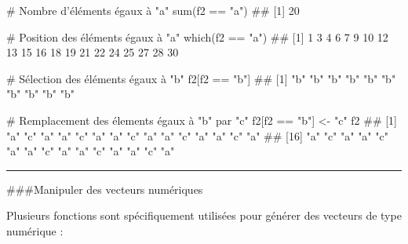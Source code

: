 \documentclass[12pt,twosided, notitlepage]{book}
\newenvironment{Shaded}{}{}
\newcommand{\CommentTok}[1]{\textcolor[rgb]{0.00,0.50,0.00}{#1}}
\newcommand{\KeywordTok}[1]{\textcolor[rgb]{0.00,0.00,1.00}{#1}}
\newcommand{\NormalTok}[1]{#1}
\newcommand{\OperatorTok}[1]{#1}
\newcommand{\StringTok}[1]{\textcolor[rgb]{0.00,0.50,0.50}{#1}}
\renewenvironment{Shaded}{\begin{snugshade}}{\end{snugshade}}
\begin{document}
\begin{enumerate}
\begin{Shaded}
\begin{Highlighting}[]
\CommentTok{# Nombre d'éléments égaux à "a"}
\KeywordTok{sum}\NormalTok{(f2 }\OperatorTok{==}\StringTok{ "a"}\NormalTok{)}
\NormalTok{  ## [1] 20}

\CommentTok{# Position des éléments égaux à "a"}
\KeywordTok{which}\NormalTok{(f2 }\OperatorTok{==}\StringTok{ "a"}\NormalTok{)}
\NormalTok{  ##  [1]  1  3  4  6  7  9 10 12 13 15 16 18 19 21 22 24 25 27 28 30}

\CommentTok{# Sélection des éléments égaux à "b"}
\NormalTok{f2[f2 }\OperatorTok{==}\StringTok{ "b"}\NormalTok{]}
\NormalTok{  ##  [1] "b" "b" "b" "b" "b" "b" "b" "b" "b" "b"}

\CommentTok{# Remplacement des élements égaux à "b" par "c"}
\NormalTok{f2[f2 }\OperatorTok{==}\StringTok{ "b"}\NormalTok{] <-}\StringTok{ "c"}
\NormalTok{f2}
\NormalTok{  ##  [1] "a" "c" "a" "a" "c" "a" "a" "c" "a" "a" "c" "a" "a" "c" "a"}
\NormalTok{  ## [16] "a" "c" "a" "a" "c" "a" "a" "c" "a" "a" "c" "a" "a" "c" "a"}
\end{Highlighting}
\end{Shaded}

  \begin{center} \rule{0.5\linewidth}{\linethickness}\end{center} 
    \bigskip 
    \fi
\end{enumerate}

\#\#\#Manipuler des vecteurs numériques

Plusieurs fonctions sont spécifiquement utilisées pour générer des
vecteurs de type numérique :
\end{document}
